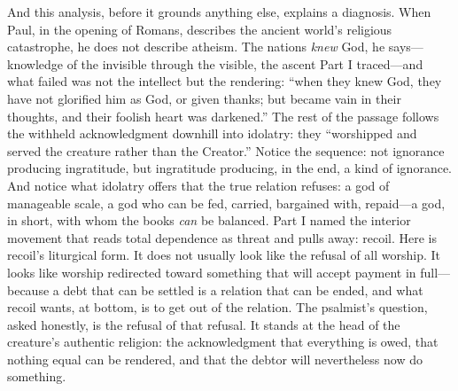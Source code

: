 And this analysis, before it grounds anything else, explains a diagnosis. When Paul, in the opening of Romans, describes the ancient world's religious catastrophe, he does not describe atheism. The nations \emph{knew} God, he says---knowledge of the invisible through the visible, the ascent Part I traced---and what failed was not the intellect but the rendering: ``when they knew God, they have not glorified him as God, or given thanks; but became vain in their thoughts, and their foolish heart was darkened.'' The rest of the passage follows the withheld acknowledgment downhill into idolatry: they ``worshipped and served the creature rather than the Creator.'' Notice the sequence: not ignorance producing ingratitude, but ingratitude producing, in the end, a kind of ignorance. And notice what idolatry offers that the true relation refuses: a god of manageable scale, a god who can be fed, carried, bargained with, repaid---a god, in short, with whom the books \emph{can} be balanced. Part I named the interior movement that reads total dependence as threat and pulls away: recoil. Here is recoil's liturgical form. It does not usually look like the refusal of all worship. It looks like worship redirected toward something that will accept payment in full---because a debt that can be settled is a relation that can be ended, and what recoil wants, at bottom, is to get out of the relation. The psalmist's question, asked honestly, is the refusal of that refusal. It stands at the head of the creature's authentic religion: the acknowledgment that everything is owed, that nothing equal can be rendered, and that the debtor will nevertheless now do something.
